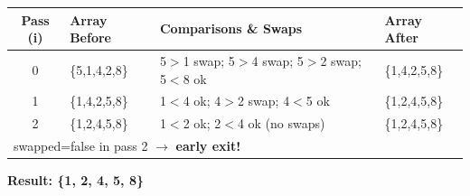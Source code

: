 \documentclass[12pt,a4paper,oneside]{book}
\begin{document}
\begin{dryrun}[Dry Run: arr = \{5, 1, 4, 2, 8\}]
\begin{center}
\begin{tabular}{clll}
\toprule
\textbf{Pass (i)} & \textbf{Array Before} & \textbf{Comparisons \& Swaps} & \textbf{Array After}\\
\midrule
0 & \{5,1,4,2,8\} & 5$>$1 swap; 5$>$4 swap; 5$>$2 swap; 5$<$8 ok & \{1,4,2,5,8\}\\
1 & \{1,4,2,5,8\} & 1$<$4 ok; 4$>$2 swap; 4$<$5 ok               & \{1,2,4,5,8\}\\
2 & \{1,2,4,5,8\} & 1$<$2 ok; 2$<$4 ok  (no swaps)               & \{1,2,4,5,8\}\\
\multicolumn{4}{l}{swapped=false in pass 2 $\to$ \textbf{early exit!}}\\
\bottomrule
\end{tabular}
\end{center}
\textbf{Result: \{1, 2, 4, 5, 8\}}
\end{dryrun}
\end{document}
